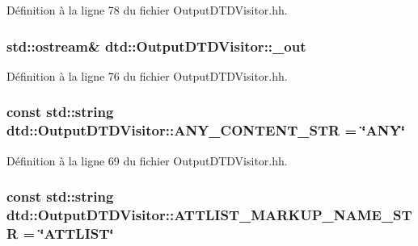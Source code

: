 Définition à la ligne 78 du fichier OutputDTDVisitor.hh.

\hypertarget{classdtd_1_1_output_d_t_d_visitor_a9a93007f2426887a2da46c30c5f2cc42}{
\subsubsection[{\_\-out}]{\setlength{\rightskip}{0pt plus 5cm}std::ostream\& {\bf dtd::OutputDTDVisitor::\_\-out}}}
\label{classdtd_1_1_output_d_t_d_visitor_a9a93007f2426887a2da46c30c5f2cc42}


Définition à la ligne 76 du fichier OutputDTDVisitor.hh.

\hypertarget{classdtd_1_1_output_d_t_d_visitor_a4f8609bcd2c8c20d1de80081835c48fc}{
\subsubsection[{ANY\_\-CONTENT\_\-STR}]{\setlength{\rightskip}{0pt plus 5cm}const std::string {\bf dtd::OutputDTDVisitor::ANY\_\-CONTENT\_\-STR} = \char`\"{}ANY\char`\"{}}}
\label{classdtd_1_1_output_d_t_d_visitor_a4f8609bcd2c8c20d1de80081835c48fc}


Définition à la ligne 69 du fichier OutputDTDVisitor.hh.

\hypertarget{classdtd_1_1_output_d_t_d_visitor_a4ce2c50f68b4f167879b57e970ca662c}{
\subsubsection[{ATTLIST\_\-MARKUP\_\-NAME\_\-STR}]{\setlength{\rightskip}{0pt plus 5cm}const std::string {\bf dtd::OutputDTDVisitor::ATTLIST\_\-MARKUP\_\-NAME\_\-STR} = \char`\"{}ATTLIST\char`\"{}}}
\label{classdtd_1_1_output_d_t_d_visitor_a4ce2c50f68b4f167879b57e970ca662c}


